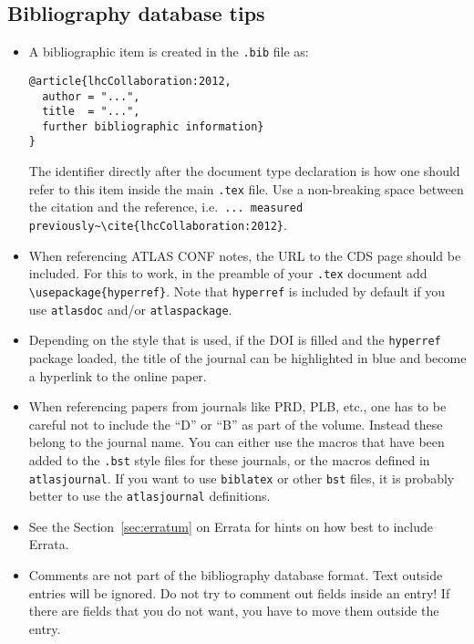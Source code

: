 \documentclass[UKenglish, texlive=2016]{\ATLASLATEXPATH atlasdoc}
\newcommand{\File}[1]{\texttt{#1}\xspace}
\newcommand{\Package}[1]{\texttt{#1}\xspace}
\begin{document}
\subsection{Bibliography database tips}

\begin{itemize}
\item A bibliographic item is created in the \File{.bib} file as:
\begin{verbatim}
@article{lhcCollaboration:2012,
  author = "...",
  title  = "...",
  further bibliographic information}
}
\end{verbatim}
  The identifier directly after the document type declaration is how one should refer to this item inside the main \File{.tex} file.
  Use a non-breaking space between the citation and the reference, i.e.\
  \verb|... measured previously~\cite{lhcCollaboration:2012}|.
\item When referencing ATLAS CONF notes, the URL to the CDS page should be included.
  For this to work, in the preamble of your \File{.tex} document add
  \texttt{\textbackslash usepackage\{hyperref\}}.
  Note that \Package{hyperref} is included by default if you use \Package{atlasdoc} and/or \Package{atlaspackage}.
\item Depending on the style that is used,
  if the DOI is filled and the \texttt{hyperref} package loaded,
  the title of the journal can be highlighted in blue and become a hyperlink to the online paper.
\item When referencing papers from journals like PRD, PLB, etc.,
  one has to be careful not to include the \enquote{D} or \enquote{B} as part of the volume.
  Instead these belong to the journal name.
  You can either use the macros that have been added to the \File{.bst} style files for these journals, or
  the macros defined in \Package{atlasjournal}.
  If you want to use \Package{biblatex} or other \File{bst} files, it is probably better to use the
  \Package{atlasjournal} definitions.
\item See the Section~{\ref{sec:erratum}} on Errata for hints on how best to include Errata.
\item Comments are not part of the bibliography database format. Text outside entries will be ignored.
  Do not try to comment out fields inside an entry!
  If there are fields that you do not want, you have to move them outside the entry.
\end{itemize}
\end{document}
